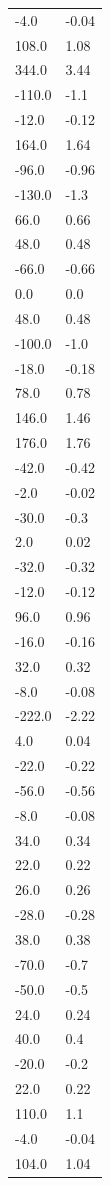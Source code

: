 \begin{longtable}{ll}
-4.0 & -0.04 \\
108.0 & 1.08 \\
344.0 & 3.44 \\
-110.0 & -1.1 \\
-12.0 & -0.12 \\
164.0 & 1.64 \\
-96.0 & -0.96 \\
-130.0 & -1.3 \\
66.0 & 0.66 \\
48.0 & 0.48 \\
-66.0 & -0.66 \\
0.0 & 0.0 \\
48.0 & 0.48 \\
-100.0 & -1.0 \\
-18.0 & -0.18 \\
78.0 & 0.78 \\
146.0 & 1.46 \\
176.0 & 1.76 \\
-42.0 & -0.42 \\
-2.0 & -0.02 \\
-30.0 & -0.3 \\
2.0 & 0.02 \\
-32.0 & -0.32 \\
-12.0 & -0.12 \\
96.0 & 0.96 \\
-16.0 & -0.16 \\
32.0 & 0.32 \\
-8.0 & -0.08 \\
-222.0 & -2.22 \\
4.0 & 0.04 \\
-22.0 & -0.22 \\
-56.0 & -0.56 \\
-8.0 & -0.08 \\
34.0 & 0.34 \\
22.0 & 0.22 \\
26.0 & 0.26 \\
-28.0 & -0.28 \\
38.0 & 0.38 \\
-70.0 & -0.7 \\
-50.0 & -0.5 \\
24.0 & 0.24 \\
40.0 & 0.4 \\
-20.0 & -0.2 \\
22.0 & 0.22 \\
110.0 & 1.1 \\
-4.0 & -0.04 \\
104.0 & 1.04 \\

\end{longtable}
